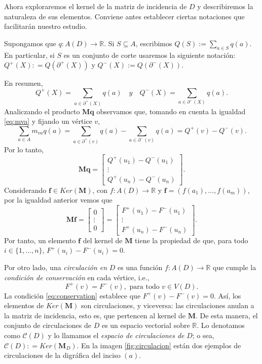 Ahora exploraremos el kernel de la matriz de incidencia de $D$ y describiremos la naturaleza de sus elementos. Conviene antes establecer ciertas notaciones que facilitarán nuestro estudio. 

Supongamos que $q \colon A(D) \rightarrow \mathbb{R}$. Si $S\subseteq A$, escribimos $Q(S):= \sum_{a \in S} q(a)$. En particular, si $S$ es un conjunto de corte usaremos la siguiente notación: $Q^{+}(X): = Q(\partial^{+}(X))$ y $Q^{-}(X):=Q(\partial^{-}(X))$.
  
En resumen,
$$
Q^{+}(X) =  \sum_{a \in \partial^{+}(X)} q(a) \quad y \quad
Q^{-}(X) = \sum_{a \in \partial^{-}(X)} q(a). 
$$
Analiczando el producto $\mathbf{M}\mathbf{q}$ observamos que, tomando en cuenta la igualdad \ref{eq:mva} y fijando un vértice $v$, 
$$
\sum_{a \in A} m_{va}q(a) = \sum_{a \in \partial^{+}(v)} q(a) - \sum_{a \in \partial^{-}(v)} q(a) = Q^{+}(v) - Q^{-}(v).
$$
Por lo tanto,
$$
\mathbf{M}\mathbf{q}=
    \begin{bmatrix}
Q^{+}(u_{1}) - Q^{-}(u_{1})\\ 
\vdots \\
Q^{+}(u_{n}) - Q^{-}(u_{n}) 
\end{bmatrix}.
$$
Considerando $\mathbf{f} \in Ker(\mathbf{M})$, con $f \colon A(D) \rightarrow \mathbb{R}$ y $\mathbf{f} = (f(a_{1}), \ldots, f(a_{m}))$, por la igualdad anterior vemos que 
$$
\mathbf{M}\mathbf{f}= 
\begin{bmatrix}
0 \\
\vdots\\
0
\end{bmatrix}= 
\begin{bmatrix}
F^{+}(u_{1}) - F^{-}(u_{1})\\
\vdots \\
F^{+}(u_{n}) - F^{-}(u_{n}) 
\end{bmatrix}.
$$
Por tanto, un elemento $\mathbf{f}$ del kernel de $\mathbf{M}$ tiene la propiedad de que, para todo $i \in \{1,\ldots, n\}$, $F^{+}(u_{i}) - F^{-}(u_{i}) = 0$.

Por otro lado, una \textit{circulación en} $D$ es una función $f \colon A(D) \rightarrow \mathbb{R}$ que cumple la \textit{condición de conservación} en cada vértice, i.e., 
\begin{equation} \label{eq:conservation}
    F^{+}(v) = F^{-}(v), \text{ para todo }v \in V(D).
\end{equation}
La condición \ref{eq:conservation} establece que $F^{+}(v) - F^{-}(v) = 0$. Así, los elementos de $Ker(\mathbf{M})$ son circulaciones, y viceversa: las circulaciones anulan a la matriz de incidencia, esto es, que pertencen al kernel de $\mathbf{M}$. De esta manera, el conjunto de circulaciones de $D$ es un espacio vectorial sobre $\mathbb{R}$. Lo denotamos como $\mathcal{C}(D)$ y lo llamamos el \textit{espacio de circulaciones de} $D$; o sea, $\mathcal{C}(D) : = Ker(\mathbf{M}_{D})$. En la imagen \ref{fig:circulacion} están dos ejemplos de circulaciones de la digráfica del inciso $(a)$.

